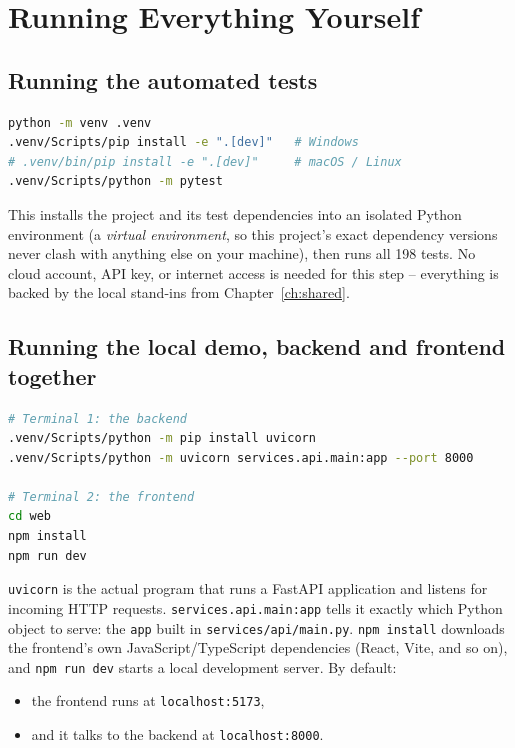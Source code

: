 \documentclass[11pt]{report}
\newcommand{\file}[1]{\texttt{#1}}
\newcommand{\code}[1]{\texttt{#1}}
\begin{document}
\chapter{Running Everything Yourself}
\label{ch:deployment}

\section{Running the automated tests}

\begin{lstlisting}[language=bash]
python -m venv .venv
.venv/Scripts/pip install -e ".[dev]"   # Windows
# .venv/bin/pip install -e ".[dev]"     # macOS / Linux
.venv/Scripts/python -m pytest
\end{lstlisting}

This installs the project and its test dependencies into an isolated
Python environment (a \emph{virtual environment}, so this project's exact
dependency versions never clash with anything else on your machine), then
runs all 198 tests. No cloud account, API key, or internet access is
needed for this step -- everything is backed by the local stand-ins from
Chapter~\ref{ch:shared}.

\section{Running the local demo, backend and frontend together}

\begin{lstlisting}[language=bash]
# Terminal 1: the backend
.venv/Scripts/python -m pip install uvicorn
.venv/Scripts/python -m uvicorn services.api.main:app --port 8000

# Terminal 2: the frontend
cd web
npm install
npm run dev
\end{lstlisting}

\code{uvicorn} is the actual program that runs a FastAPI application and
listens for incoming HTTP requests. \code{services.api.main:app} tells it
exactly which Python object to serve: the \code{app} built in
\file{services/api/main.py}. \code{npm install} downloads the frontend's
own JavaScript/TypeScript dependencies (React, Vite, and so on), and
\code{npm run dev} starts a local development server. By default:

\begin{itemize}[leftmargin=2em]
  \item the frontend runs at \texttt{localhost:5173},
  \item and it talks to the backend at \texttt{localhost:8000}.
\end{itemize}
\end{document}
